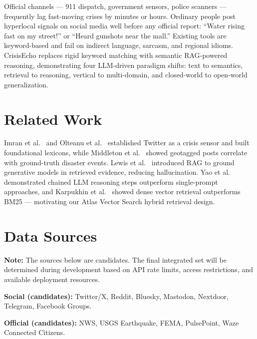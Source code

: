 \documentclass[conference]{IEEEtran}
\begin{document}
Official channels --- 911 dispatch, government sensors, police scanners ---
frequently lag fast-moving crises by minutes or hours. Ordinary people post
hyperlocal signals on social media well before any official report: ``Water
rising fast on my street!'' or ``Heard gunshots near the mall.'' Existing
tools are keyword-based and fail on indirect language, sarcasm, and regional
idioms. CrisisEcho replaces rigid keyword matching with semantic RAG-powered
reasoning, demonstrating four LLM-driven paradigm shifts: text to semantics,
retrieval to reasoning, vertical to multi-domain, and closed-world to
open-world generalization.

\section{Related Work}

Imran et al.~\cite{imran2016twitter} and Olteanu et al.~\cite{olteanu2014crisislex}
established Twitter as a crisis sensor and built foundational lexicons, while
Middleton et al.~\cite{middleton2014real} showed geotagged posts correlate with
ground-truth disaster events. Lewis et al.~\cite{lewis2020rag} introduced RAG
to ground generative models in retrieved evidence, reducing hallucination. Yao
et al.~\cite{yao2023react} demonstrated chained LLM reasoning steps outperform
single-prompt approaches, and Karpukhin et al.~\cite{karpukhin2020dense} showed
dense vector retrieval outperforms BM25 --- motivating our Atlas Vector Search
hybrid retrieval design.

\section{Data Sources}

\textbf{Note:} The sources below are candidates. The final integrated set will
be determined during development based on API rate limits, access restrictions,
and available deployment resources.

\textbf{Social (candidates):} Twitter/X, Reddit, Bluesky, Mastodon, Nextdoor,
Telegram, Facebook Groups.

\textbf{Official (candidates):} NWS, USGS Earthquake, FEMA, PulsePoint, Waze
Connected Citizens.
\end{document}
